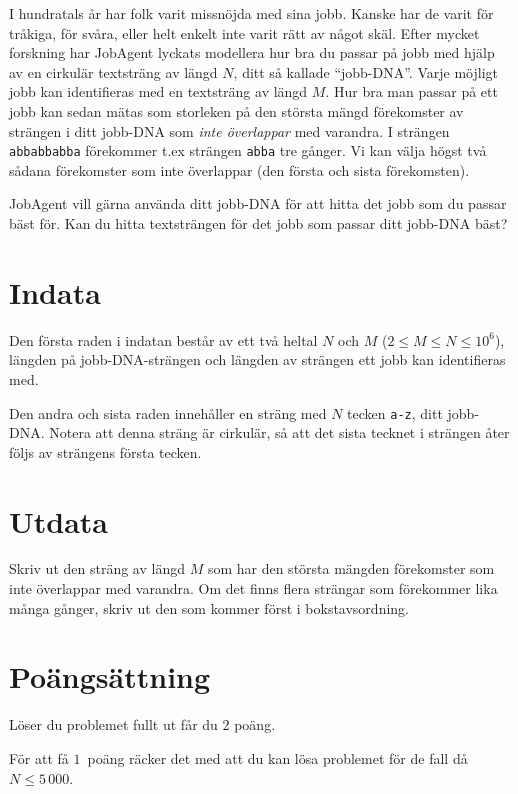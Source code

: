 I hundratals år har folk varit missnöjda med sina jobb.
Kanske har de varit för tråkiga, för svåra, eller helt enkelt inte varit rätt av något skäl.
Efter mycket forskning har JobAgent lyckats modellera hur bra du passar på jobb med hjälp av en cirkulär textsträng av längd $N$, ditt så kallade ``jobb-DNA''.
Varje möjligt jobb kan identifieras med en textsträng av längd $M$.
Hur bra man passar på ett jobb kan sedan mätas som storleken på den största mängd förekomster av strängen i ditt jobb-DNA som \emph{inte överlappar} med varandra.
I strängen \texttt{abbabbabba} förekommer t.ex strängen \texttt{abba} tre gånger.
Vi kan välja högst två sådana förekomster som inte överlappar (den första och sista förekomsten).

JobAgent vill gärna använda ditt jobb-DNA för att hitta det jobb som du passar bäst för.
Kan du hitta textsträngen för det jobb som passar ditt jobb-DNA bäst?

\section*{Indata}
Den första raden i indatan består av ett två heltal $N$ och $M$ ($2 \le M \le N \le 10^6$), längden på jobb-DNA-strängen och längden av strängen ett jobb kan identifieras med.

Den andra och sista raden innehåller en sträng med $N$ tecken \texttt{a-z}, ditt jobb-DNA.
Notera att denna sträng är cirkulär, så att det sista tecknet i strängen åter följs av strängens första tecken.

\section*{Utdata}
Skriv ut den sträng av längd $M$ som har den största mängden förekomster som inte överlappar med varandra.
Om det finns flera strängar som förekommer lika många gånger, skriv ut den som kommer först i bokstavsordning.

\section*{Poängsättning}
Löser du problemet fullt ut får du $2$ poäng.

För att få $1$ poäng räcker det med att du kan lösa problemet för de fall då $N \le 5\,000$.
